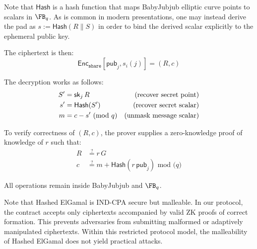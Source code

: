 Note that $\mathsf{Hash}$ is a hash function that maps BabyJubjub elliptic curve points to scalars in $\FB_q$. As is common in modern presentations, one may instead derive the pad as $s := \mathsf{Hash}(R \parallel S)$ in order to bind the derived scalar explicitly to the ephemeral public key.

The ciphertext is then:
\[
    \mathsf{Enc}_{\mathtt{share}}[\mathsf{pub}_j, s_i(j)] = (R, c)
\]

The decryption works as follows:
\begin{align*}
    S' &= \mathsf{sk}_j \, R \hspace{.05cm } &\text{(recover secret point)}\\
    s' &= \mathsf{Hash}(S') &\text{(recover secret scalar)}\\
    m &= c - s' \text{ (mod } q \text{)} &\text{(unmask message scalar)}
\end{align*}


To verify correctness of $(R, c)$, the prover supplies a zero-knowledge proof of knowledge of $r$ such that:
\begin{align*}
    R &\overset{?}{=} r \, G \\
    c &\overset{?}{=} m + \mathsf{Hash}(r \, \mathsf{pub}_j) \text{ mod ($q$)}
\end{align*}

All operations remain inside BabyJubjub and \(\FB_q\).

Note that Hashed ElGamal is IND-CPA secure but malleable. In our protocol, the contract accepts only ciphertexts accompanied by valid ZK proofs of correct formation. This prevents adversaries from submitting malformed or adaptively manipulated ciphertexts. Within this restricted protocol model, the malleability of Hashed ElGamal does not yield practical attacks.
